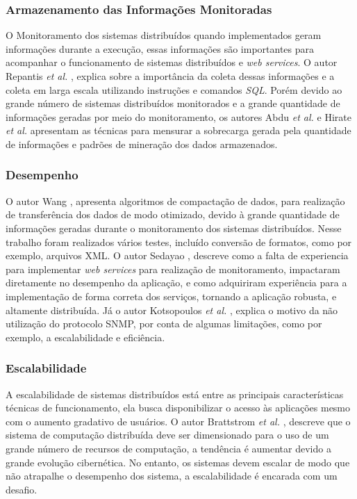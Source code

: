 \subsubsection{Armazenamento das Informações Monitoradas}

O Monitoramento dos sistemas distribuídos quando implementados geram informações durante a execução, essas informações são importantes para acompanhar o funcionamento de sistemas distribuídos e \textit{web services}. O autor Repantis \textit{et al.} \cite{repantis2010scaling}, explica sobre a importância da coleta dessas informações e a coleta em larga escala utilizando instruções e comandos \textit{SQL}. Porém devido ao grande número de sistemas distribuídos monitorados e a grande quantidade de informações geradas por meio do monitoramento, os autores Abdu \textit{et al.} e Hirate \textit{et al.} \cite{abdu1996monitoring,hirate2009profiling} apresentam as técnicas para mensurar a sobrecarga gerada pela quantidade de informações e padrões de mineração dos dados armazenados.  

\subsubsection{Desempenho}

O autor Wang \cite{wang2016improvements}, apresenta algoritmos de compactação de dados, para realização de transferência dos dados de modo otimizado, devido à grande quantidade de informações geradas durante o monitoramento dos sistemas distribuídos. Nesse trabalho foram realizados vários testes, incluído conversão de formatos, como por exemplo, arquivos XML. O autor Sedayao \cite{sedayao2008implementing}, descreve como a falta de experiencia para implementar \textit{web services} para realização de monitoramento, impactaram diretamente no desempenho da aplicação, e como adquiriram experiência para a implementação de forma correta dos serviços, tornando a aplicação robusta, e altamente distribuída. Já o autor Kotsopoulos \textit{et al.} \cite{kotsopoulos2008soa}, explica o motivo da não utilização do protocolo \acrshort{SNMP}, por conta de algumas limitações, como por exemplo, a escalabilidade e eficiência. 

\subsubsection{Escalabilidade}

A escalabilidade de sistemas distribuídos está entre as principais características técnicas de funcionamento, ela busca disponibilizar o acesso às aplicações mesmo com o aumento gradativo de usuários. O autor Brattstrom \textit{et al.} \cite{Brattstrom_7987194}, descreve que o sistema de computação distribuída deve ser dimensionado para o uso de um grande número de recursos de computação, a tendência é aumentar devido a grande evolução cibernética. No entanto, os sistemas devem escalar de modo que não atrapalhe o desempenho dos sistema, a escalabilidade é encarada com um desafio. 

